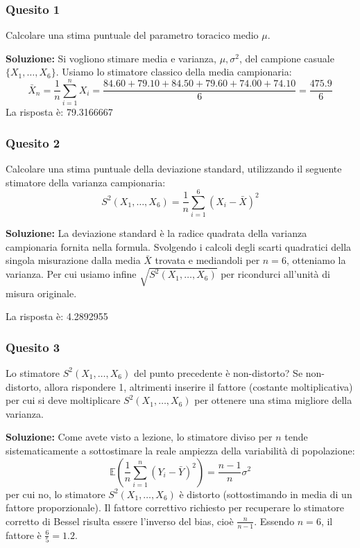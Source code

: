 \documentclass[12pt, a4paper]{article}
\begin{document}
\subsubsection*{Quesito 1}
Calcolare una stima puntuale del parametro toracico medio $\mu$.

\textbf{Soluzione:}
Si vogliono stimare media e varianza, $\mu, \sigma^2$, del campione casuale $\{X_1,\dots,X_6\}$.
Usiamo lo stimatore classico della media campionaria:
$$ \bar{X}_n = \frac{1}{n} \sum_{i=1}^n X_i = \frac{84.60 + 79.10 + 84.50 + 79.60 + 74.00 + 74.10}{6} = \frac{475.9}{6} $$
La risposta è: 79.3166667

\subsubsection*{Quesito 2}
Calcolare una stima puntuale della deviazione standard, utilizzando il seguente stimatore della varianza campionaria:
$$ S^2(X_1,\dots,X_6) = \frac{1}{n} \sum_{i=1}^6 (X_i - \bar{X})^2 $$

\textbf{Soluzione:}
La deviazione standard è la radice quadrata della varianza campionaria fornita nella formula.
Svolgendo i calcoli degli scarti quadratici della singola misurazione dalla media $\bar{X}$ trovata e mediandoli per $n=6$, otteniamo la varianza. Per cui usiamo infine $\sqrt{S^2(X_1,\dots,X_6)}$ per ricondurci all'unità di misura originale.

La risposta è: 4.2892955

\subsubsection*{Quesito 3}
Lo stimatore $S^2(X_1,\dots,X_6)$ del punto precedente è non-distorto?
Se non-distorto, allora rispondere 1, altrimenti inserire il fattore (costante moltiplicativa) per cui si deve moltiplicare $S^2(X_1,\dots,X_6)$ per ottenere una stima migliore della varianza.

\textbf{Soluzione:}
Come avete visto a lezione, lo stimatore diviso per $n$ tende sistematicamente a sottostimare la reale ampiezza della variabilità di popolazione:
$$ \mathbb{E}\left(\frac{1}{n} \sum_{i=1}^n (Y_i - \bar{Y})^2\right) = \frac{n-1}{n} \sigma^2 $$
per cui no, lo stimatore $S^2(X_1,\dots,X_6)$ è distorto (sottostimando in media di un fattore proporzionale). Il fattore correttivo richiesto per recuperare lo stimatore corretto di Bessel risulta essere l'inverso del bias, cioè $\frac{n}{n-1}$.
Essendo $n=6$, il fattore è $\frac{6}{5} = 1.2$.
\end{document}
